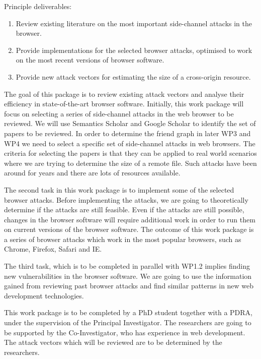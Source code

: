 \documentclass[a4paper,11pt]{article}
\begin{document}
Principle deliverables:
\begin{enumerate}
\item Review existing literature on the most important side-channel attacks in the browser.
\item Provide implementations for the selected browser attacks, optimised to work on the most recent versions of browser software. 
\item Provide new attack vectors for estimating the size of a cross-origin resource.
\end{enumerate}

The goal of this package is to review existing attack vectors and analyse their efficiency in state-of-the-art browser software. Initially, this work package will focus on selecting a series of side-channel attacks in the web browser to be reviewed. We will use Semantics Scholar \cite{semanticsearch} and Google Scholar\cite{googlescholar} to identify the set of papers to be reviewed. In order to determine the friend graph in later WP3 and WP4 we need to select a specific set of side-channel attacks in web browsers. The criteria for selecting the papers is that they can be applied to real world scenarios where we are trying to determine the size of a remote file. Such attacks have been around for years and there are lots of resources available. 

The second task in this work package is to implement some of the selected browser attacks. Before implementing the attacks, we are going to theoretically determine if the attacks are still feasible. Even if the attacks are still possible, changes in the browser software will require additional work in order to run them on current versions of the browser software. The outcome of this work package is a series of browser attacks which work in the most popular browsers, such as Chrome, Firefox, Safari and IE. 

The third task, which is to be completed in parallel with WP1.2 implies finding new vulnerabilities in the browser software. We are going to use the information gained from reviewing past browser attacks and find similar patterns in new web development technologies. 

This work package is to be completed by a PhD student together with a PDRA, under the supervision of the Principal Investigator. The researchers are going to be supported by the Co-Investigator, who has experience in web development. The attack vectors which will be reviewed are to be determined by the researchers.
\end{document}
